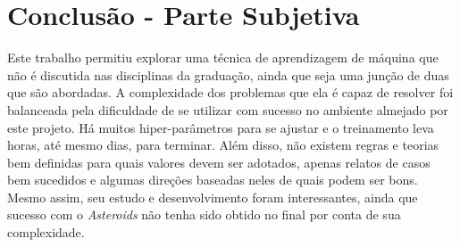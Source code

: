 
\chapter{Conclusão - Parte Subjetiva}
\label{cap:conclusoes}

Este trabalho permitiu explorar uma técnica de aprendizagem de máquina que não é discutida nas disciplinas da graduação, ainda que seja uma junção de duas que são abordadas.
A complexidade dos problemas que ela é capaz de resolver foi balanceada pela dificuldade de se utilizar com sucesso no ambiente almejado por este projeto.
Há muitos hiper-parâmetros para se ajustar e o treinamento leva horas, até mesmo dias, para terminar.
Além disso, não existem regras e teorias bem definidas para quais valores devem ser adotados, apenas relatos de casos bem sucedidos e algumas direções baseadas neles de quais podem ser bons.
Mesmo assim, seu estudo e desenvolvimento foram interessantes, ainda que sucesso com o \textit{Asteroids} não tenha sido obtido no final por conta de sua complexidade.





